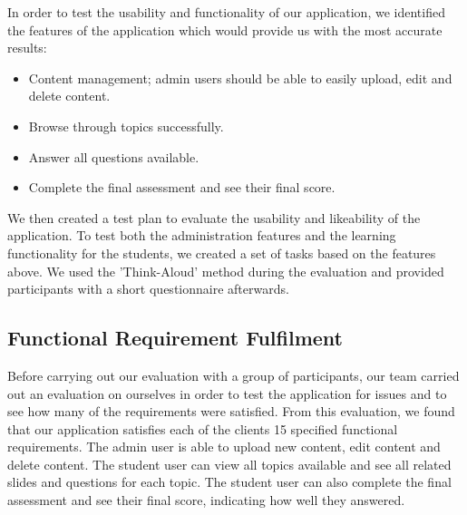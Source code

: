 \documentclass{l3proj}
\begin{document}
{In order to test the usability and functionality of our application, we identified the features of the application which would provide us with the most accurate results:

\begin{itemize}
\item Content management; admin users should be able to easily upload, edit and delete content.
\item Browse through topics successfully.
\item Answer all questions available.
\item Complete the final assessment and see their final score. 
\end{itemize}

We then created a test plan to evaluate the usability and likeability of the application. To test both the administration features and the learning functionality for the students, we created a set of tasks based on the features above. We used the 'Think-Aloud' method during the evaluation and provided participants with a short questionnaire afterwards.

\subsection{Functional Requirement Fulfilment}

%

Before carrying out our evaluation with a group of participants, our team carried out an evaluation on ourselves in order to test the application for issues and to see how many of the requirements were satisfied. From this evaluation, we found that our application satisfies each of the clients 15 specified functional requirements. The admin user is able to upload new content, edit content and delete content. The student user can view all topics available and see all related slides and questions for each topic. The student user can also complete the final assessment and see their final score, indicating how well they answered.

}
\end{document}
